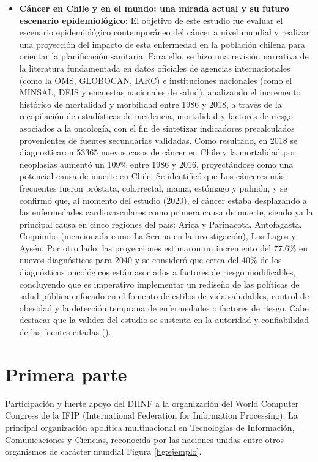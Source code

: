 \begin{itemize}
    \item \textbf{Cáncer en Chile y en el mundo: una mirada actual y su futuro escenario epidemiológico:} El objetivo de este estudio fue evaluar el escenario epidemiológico contemporáneo del cáncer a nivel mundial y realizar una proyección del impacto de esta enfermedad en la población chilena para orientar la planificación sanitaria. Para ello, se hizo una revisión narrativa de la literatura fundamentada en datos oficiales de agencias internacionales (como la OMS, GLOBOCAN, IARC) e instituciones nacionales (como el MINSAL, DEIS y encuestas nacionales de salud), analizando el incremento histórico de mortalidad y morbilidad entre 1986 y 2018, a través de la recopilación de estadísticas de incidencia, mortalidad y factores de riesgo asociados a la oncología, con el fin de sintetizar indicadores precalculados provenientes de fuentes secundarias validadas. Como resultado, en 2018 se diagnosticaron 53365 nuevos casos de cáncer en Chile y la mortalidad por neoplasias aumentó un 109\% entre 1986 y 2016, proyectándose como una potencial causa de muerte en Chile. Se identificó que Los cánceres más frecuentes fueron próstata, colorrectal, mama, estómago y pulmón, y se confirmó que, al momento del estudio (2020), el cáncer estaba desplazando a las enfermedades cardiovasculares como primera causa de muerte, siendo ya la principal causa en cinco regiones del país: Arica y Parinacota, Antofagasta, Coquimbo (mencionada como La Serena en la investigación), Los Lagos y Aysén. Por otro lado, las proyecciones estimaron un incremento del 77.6\% en nuevos diagnósticos para 2040 y se consideró que cerca del 40\% de los diagnósticos oncológicos están asociados a factores de riesgo modificables, concluyendo que es imperativo implementar un rediseño de las políticas de salud pública enfocado en el fomento de estilos de vida saludables, control de obesidad y la detección temprana de enfermedades o factores de riesgo. Cabe destacar que la validez del estudio se sustenta en la autoridad y confiabilidad de las fuentes citadas (\cite{scielo4}). 

\end{itemize}










\section{Primera parte}
\label{sec:primera}
Participación y fuerte apoyo del DIINF a la organización del World Computer Congress de la IFIP (International Federation for Information Processing). La principal organización apolítica multinacional en Tecnologías de Información, Comunicaciones y Ciencias, reconocida por las naciones unidas entre otros organismos de carácter mundial Figura \ref{fig:ejemplo}.

